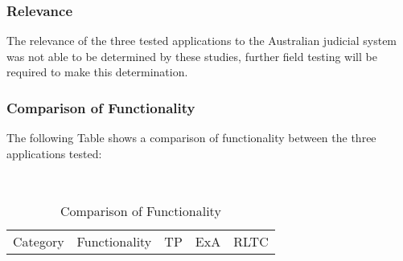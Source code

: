 \subsubsection{Relevance}
The relevance of the three tested applications to the Australian judicial system was not able to be determined by these studies, further field testing will be required to make this determination.
\newpage

\subsubsection{Comparison of Functionality}
The following Table shows a comparison of functionality between the three applications tested: 

\begin{center}
\begin{table}[h!]
\label{tab:ComparisonOfFunctionality}    
\caption{Comparison of Functionality}

\small
\centering
\
\singlespace

\begin{tabular}{|l| c|| c| c| c |} 
\hline
\rowcolor{lightgrey} Category & Functionality & TP & ExA & RLTC \\  


\end{tabular}
\end{table}
\end{center}
